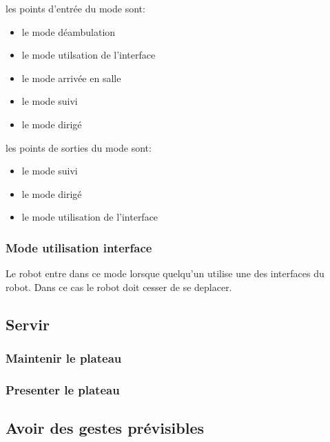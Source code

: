 les points d'entrée du mode sont:
\begin{itemize}
\item le mode déambulation
\item le mode utilsation de l'interface
\item le mode arrivée en salle
\item le mode suivi
\item le mode dirigé\\
\end{itemize}

les points de sorties du mode sont:
\begin{itemize}
\item le mode suivi
\item le mode dirigé
\item le mode utilisation de l'interface\\
\end{itemize}

\subsubsection{Mode utilisation interface}
Le robot entre dans ce mode lorsque quelqu'un utilise une des
interfaces du robot. Dans ce cas le robot doit cesser de se deplacer.

\subsection{Servir}

\subsubsection{Maintenir le plateau}

\subsubsection{Presenter le plateau}

\subsection{Avoir des gestes prévisibles}
 
